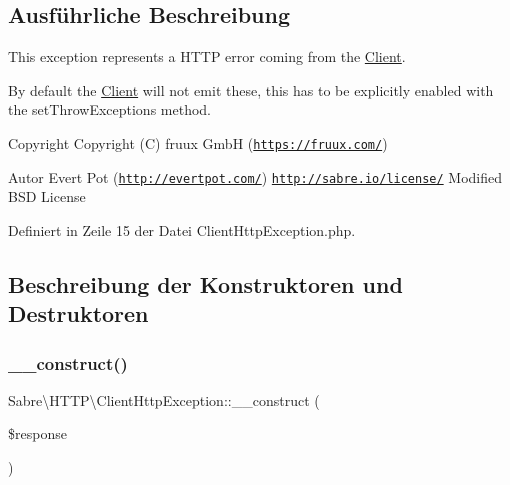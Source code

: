 \subsection{Ausführliche Beschreibung}
This exception represents a H\+T\+TP error coming from the \mbox{\hyperlink{class_sabre_1_1_h_t_t_p_1_1_client}{Client}}.

By default the \mbox{\hyperlink{class_sabre_1_1_h_t_t_p_1_1_client}{Client}} will not emit these, this has to be explicitly enabled with the set\+Throw\+Exceptions method.

\begin{DoxyCopyright}{Copyright}
Copyright (C) fruux GmbH (\href{https://fruux.com/}{\tt https\+://fruux.\+com/}) 
\end{DoxyCopyright}
\begin{DoxyAuthor}{Autor}
Evert Pot (\href{http://evertpot.com/}{\tt http\+://evertpot.\+com/})  \href{http://sabre.io/license/}{\tt http\+://sabre.\+io/license/} Modified B\+SD License 
\end{DoxyAuthor}


Definiert in Zeile 15 der Datei Client\+Http\+Exception.\+php.



\subsection{Beschreibung der Konstruktoren und Destruktoren}
\mbox{\label{class_sabre_1_1_h_t_t_p_1_1_client_http_exception_ae9d812bde55cce7d2c6445c83153d14b}} 
\subsubsection{\texorpdfstring{\+\_\+\+\_\+construct()}{\_\_construct()}}
{\footnotesize\ttfamily Sabre\textbackslash{}\+H\+T\+T\+P\textbackslash{}\+Client\+Http\+Exception\+::\+\_\+\+\_\+construct (\begin{DoxyParamCaption}\item[{\mbox{\hyperlink{interface_sabre_1_1_h_t_t_p_1_1_response_interface}{Response\+Interface}}}]{\$response }\end{DoxyParamCaption})}

